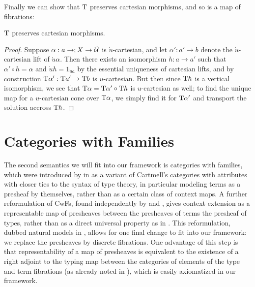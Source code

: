 \documentclass[../thesis.tex]{subfiles}
\begin{document}
Finally we can show that ${{\mathrm{T}}}$ preserves cartesian morphisms, and so is a map of fibrations:
\begin{lemma}\label{lem:comp typ preserves cartesian}
  ${{\mathrm{T}}}$ preserves cartesian morphisms.
\end{lemma}
\begin{proof}
  Suppose $\alpha : a \to  ; X \to \dot{{\mathcal{U}}}$ is $\dot u$-cartesian, and let $\alpha' : a' \to b$ denote the $\dot u$-cartesian
  lift of $\dot u\alpha$. Then there exists an isomorphism $h : a \to a'$ such that $\alpha' \circ h = \alpha$ and $\dot u h =
  1_{\dot u a}$ by the essential
  uniqueness of cartesian lifts, and by construction ${{\mathrm{T}}}\alpha' : {{\mathrm{T}}} a' \to {{\mathrm{T}}} b$ is $u$-cartesian. But then since ${{\mathrm{T}}}
  h$ is a vertical isomorphism, we see that ${{\mathrm{T}}} \alpha = {{\mathrm{T}}} \alpha' \circ {{\mathrm{T}}} h$ is $u$-cartesian as well; to find the
  unique map for a $u$-cartesian cone over ${{\mathrm{T}}}\alpha$, we simply find it for ${{\mathrm{T}}}\alpha'$ and transport the solution accross
  ${{\mathrm{T}}} h$.
\end{proof}

\newcommand\GNM{\mathrm{GNM}}
\section{Categories with Families}
The second semantics we will fit into our framework is categories with families, which were introduced by
\citeauthor{dybjer1996} in \cite{dybjer1996} as a variant of Cartmell's categories with attributes with
closer ties to the syntax of type theory, in particular modeling terms as a presheaf by themselves, rather
than as a certain class of context maps. A further reformulation of CwFs, found independently by \citeauthor{
fiore2012} \cite{fiore2012} and \citeauthor{awodey2017} \cite{awodey2017}, gives context extension as a
representable map of presheaves between the presheaves of terms the presheaf of types, rather than as a
direct universal property as in \cite{dybjer1996}.  This reformulation, dubbed natural models in \cite{
awodey2017}, allows for one final change to fit into our framework: we replace the presheaves by discrete
fibrations. One advantage of this step is that representability of a map of presheaves is equivalent to the
existence of a right adjoint to the typing map between the categories of elements of the type and term
fibrations (as already noted in \cite{awodey2017}), which is easily axiomatized in our framework.
\end{document}
